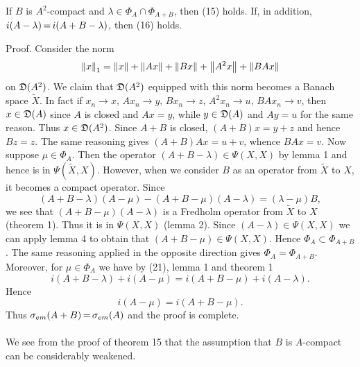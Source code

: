 \documentclass[11pt,twoside]{article}
\begin{document}
\begin{theorem1} %
If $B$ is $A^2$-compact and $\lambda \in \Phi_A \cap \Phi_{A+B}$,
then (15) holds.
If, in addition, $i(A-\lambda) {\,=\,} i(A+B-\lambda)$, then (16) holds.
\end{theorem1}

Proof.
Consider the norm
\[
\left\lVert x \right\rVert_1 = \left\lVert x \right\rVert + \left\lVert Ax \right\rVert + \left\lVert Bx \right\rVert + \left\lVert A^2x \right\rVert + \left\lVert BAx \right\rVert
\]
on $\mathfrak{D}(A^2)$.
We claim that $\mathfrak{D}(A^2)$ equipped with this norm
becomes a Banach space $\tilde{X}$.
In fact if
$x_n \to x$,
$Ax_n \to y$,
$Bx_n \to z$,
$A^2x_n \to u$,
$BAx_n \to v$,
then $x \in \mathfrak{D}(A)$ since $A$ is closed
and $Ax = y$,
while $y \in \mathfrak{D}(A)$ and $Ay = u$ for the same reason.
Thus $x \in \mathfrak{D}(A^2)$.
Since $A+B$ is closed,
$(A+B)x = y+z$ and hence $Bz = z$.
The same reasoning gives $(A+B)Ax = u + v$,
whence $BAx = v$.
Now suppose $\mu \in \Phi_A$.
Then the operator $(A + B - \lambda) \in \Psi(X,X)$ by lemma 1
and hence is in $\Psi(\tilde{X},X)$.
However,
when we consider $B$ as an operator from $\tilde{X}$ to $X$,
it becomes a compact operator.
Since
\begin{equation}\tag{21}
(A+B-\lambda)(A-\mu) - (A+B-\mu)(A-\lambda) = (\lambda-\mu)B,
\end{equation}
we see that $(A + B - \mu)(A - \lambda)$ is a Fredholm operator
from $\tilde{X}$ to $X$ (theorem 1).
Thus it is in $\Psi(X,X)$ (lemma 2).
Since
$(A-\lambda) \in \Psi(X,X)$ we can apply lemma 4 to obtain that
$(A + B - \mu) \in \Psi(X,X)$.
Hence $\Phi_A \subset \Phi_{A+B}$.
The same reasoning applied in the opposite direction gives
$\Phi_A = \Phi_{A+B}$.
Moreover,
for $\mu \in \Phi_A$ we have by (21), lemma 1 and theorem 1
\[
i(A+B-\lambda) + i(A-\mu) = i(A+B-\mu) + i(A-\lambda).
\]
Hence
\[
i(A-\mu) = i(A+B-\mu).
\]
Thus $\sigma_{em}(A + B) {\,=\,} \sigma_{em}(A)$ and the proof is complete.

\paragraph*{}
We see from the proof of theorem 15 that the assumption
that $B$ is $A$-compact can be considerably weakened.

\end{document}
